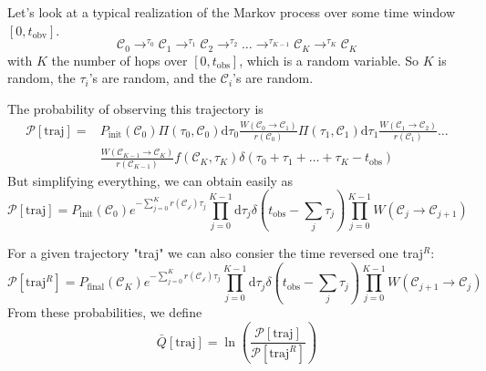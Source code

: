 \documentclass[a4paper]{book}
\theoremstyle{definition}
\theoremstyle{remark}
\begin{document}
Let's look at a typical realization of the Markov process over some time window $[0, t_{\text{obv}}]$.
\begin{equation}
    \mathscr{C}_0 \rightarrow^{\tau_0} \mathscr{C}_1 \rightarrow^{\tau_1} \mathscr{C}_2 \rightarrow^{\tau_2} \dots \rightarrow^{\tau_{K-1}} \mathscr{C}_K\rightarrow^{\tau_{K}} \mathscr{C}_K
\end{equation}
with $K$ the number of hops over $[0, t_{\text{obs}}]$, which is a random variable. So $K$ is random, the $\tau_i$'s are random, and the $\mathscr{C}_i$'s are random. \par \medskip 

The probability of observing this trajectory is 
\begin{equation}
    \begin{aligned}
        \mathscr{P}[\text{traj}] = &P_{\text{init}}(\mathscr{C}_0) \Pi(\tau_0, \mathscr{C}_0) \text{d}\tau_0 \frac{W(\mathscr{C}_0 \rightarrow \mathscr{C}_1)}{r(\mathscr{C}_0)} \Pi(\tau_1, \mathscr{C}_1) \text{d}\tau_1 \frac{W(\mathscr{C}_1 \rightarrow \mathscr{C}_2)}{r(\mathscr{C}_1)} \dots\\ &\frac{W(\mathscr{C}_{K-1} \rightarrow \mathscr{C}_K)}{r(\mathscr{C}_{K-1})}f(\mathscr{C}_K, \tau_K)\delta(\tau_0 + \tau_1 + \dots + \tau_K - t_{\text{obs}})
    \end{aligned}
\end{equation}
But simplifying everything, we can obtain easily as
\begin{equation}
    \mathscr{P}[\text{traj}] = P_{\text{init}}(\mathscr{C}_0) e^{-\sum_{j=0}^{K}r(\mathscr{C_j})\tau_j}\prod_{j=0}^{K-1}\text{d}\tau_j \delta(t_{\text{obs}} - \sum_j \tau_j) \prod_{j=0}^{K-1}W(\mathscr{C}_j \rightarrow \mathscr{C}_{j+1})
\end{equation}

For a given trajectory "traj" we can also consier the time reversed one traj$^R$: 
\begin{equation}
    \mathscr{P}[\text{traj}^R] = P_{\text{final}}(\mathscr{C}_K) e^{-\sum_{j=0}^{K}r(\mathscr{C_j})\tau_j}\prod_{j=0}^{K-1}\text{d}\tau_j \delta(t_{\text{obs}} - \sum_j \tau_j) \prod_{j=0}^{K-1}W(\mathscr{C}_{j+1} \rightarrow \mathscr{C}_{j})
\end{equation}
From these probabilities, we define 
\begin{equation}
    \bar{Q}[\text{traj}] = \ln \left(\frac{\mathscr{P}[\text{traj}]}{\mathscr{P}[\text{traj}^R]}\right)
\end{equation}
\end{document}
